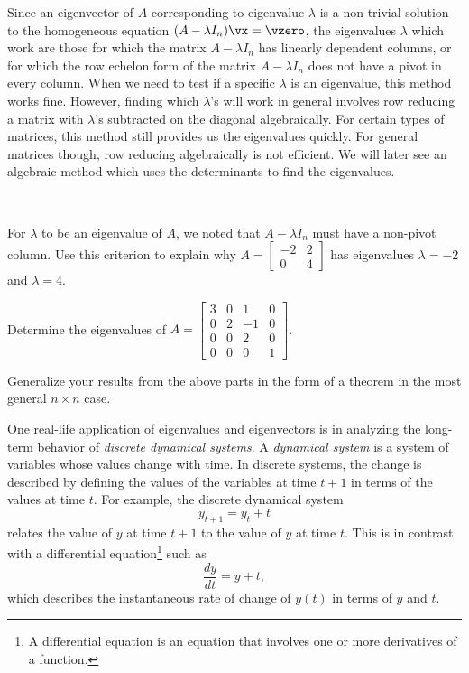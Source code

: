 Since an eigenvector of $A$ corresponding to eigenvalue $\lambda$ is a non-trivial solution to the homogeneous equation $(A - \lambda I_n)\vx = \vzero$, the eigenvalues $\lambda$ which work are those for which the matrix $A-\lambda I_n$ has linearly dependent columns, or for which the row echelon form of the matrix $A-\lambda I_n$ does not have a pivot in every column. When we need to test if a specific $\lambda$ is an eigenvalue, this method works fine. However, finding which $\lambda$'s will work in general involves row reducing a matrix with $\lambda$'s subtracted on the diagonal algebraically. For certain types of matrices, this method still provides us the eigenvalues quickly. For general matrices though, row reducing algebraically is not efficient. We will later see an algebraic method which uses the determinants to find the eigenvalues.



\begin{activity} ~
\ba
\item For $\lambda$ to be an eigenvalue of $A$, we noted that $A-\lambda I_n$ must have a non-pivot column. Use this criterion to explain why $A=\left[ \begin{array}{rc} -2&2\\0&4 \end{array} \right]$ has eigenvalues $\lambda=-2$ and $\lambda=4$.



\item Determine the eigenvalues of $A = \left[ \begin{array}{ccrc} 3&0&1&0 \\ 0&2&-1&0 \\ 0&0&2&0 \\ 0&0&0&1 \end{array} \right]$. 



\item Generalize your results from the above parts in the form of a theorem in the most general $n\times n$ case.



\ea
\end{activity}

\label{sec:dynam_sys}

One real-life application of eigenvalues and eigenvectors is in analyzing the long-term behavior of \emph{discrete dynamical systems}. A \emph{dynamical system} is a system of variables whose values change with time. In discrete systems, the change is described by defining the values of the variables at time $t+1$ in terms of the values at time $t$. For example, the discrete dynamical system 
\[y_{t+1} = y_t + t\]
relates the value of $y$ at time $t+1$ to the value of $y$ at time $t$. This is in contrast with a differential equation\footnote{A differential equation is an equation that involves one or more derivatives of a function.}  such as  
\[ \frac{dy}{dt} = y+t,\]
which describes the instantaneous rate of change of $y(t)$ in terms of $y$ and $t$.

